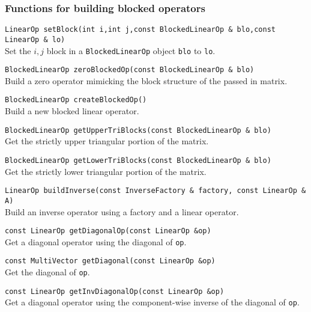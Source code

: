 \documentclass[12pt]{article}
\newcommand{\code}[1]{\lstinline[basicstyle=\footnotesize]!#1!}
\newcommand{\scode}[1]{\lstinline[basicstyle=\small\bfseries]!#1!}
\begin{document}
\subsubsection{Functions for building blocked operators}
\begin{framed}
\begin{flushleft}
\scode{LinearOp setBlock(int i,int j,const BlockedLinearOp & blo,const LinearOp & lo)} \\
Set the $i,j$ block in a \code{BlockedLinearOp} object \code{blo} to \code{lo}.

\vspace{10pt}
\scode{BlockedLinearOp zeroBlockedOp(const BlockedLinearOp & blo)} \\
Build a zero operator mimicking the block structure of the passed in matrix. 

\vspace{10pt}
\scode{BlockedLinearOp createBlockedOp()} \\
Build a new blocked linear operator.

\vspace{10pt}
\scode{BlockedLinearOp getUpperTriBlocks(const BlockedLinearOp & blo)} \\
Get the strictly upper triangular portion of the matrix.

\vspace{10pt}
\scode{BlockedLinearOp getLowerTriBlocks(const BlockedLinearOp & blo)} \\
Get the strictly lower triangular portion of the matrix. 

\vspace{10pt}
\scode{LinearOp buildInverse(const InverseFactory & factory, const LinearOp & A)} \\
Build an inverse operator using a factory and a linear operator. 

\vspace{10pt}
\scode{const LinearOp getDiagonalOp(const LinearOp &op)} \\
Get a diagonal operator using the diagonal of \code{op}.

\vspace{10pt}
\scode{const MultiVector getDiagonal(const LinearOp &op)} \\
Get the diagonal of \code{op}.

\vspace{10pt}
\scode{const LinearOp getInvDiagonalOp(const LinearOp &op)} \\
Get a diagonal operator using the component-wise inverse of the
diagonal of \code{op}.
\end{flushleft}
\end{framed}
\end{document}
